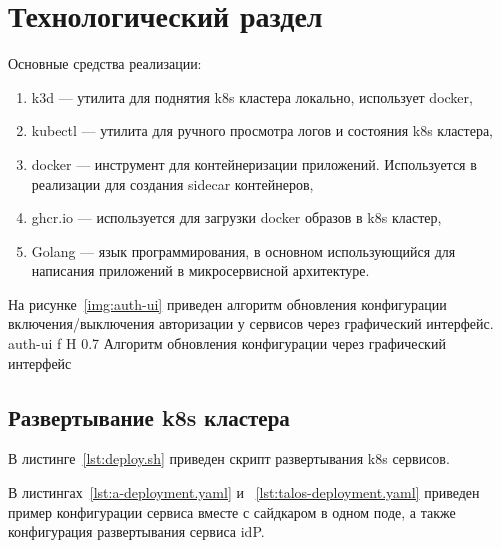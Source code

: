 \chapter{Технологический раздел}

Основные средства реализации:
\begin{enumerate}
\item k3d --- утилита для поднятия k8s кластера локально, использует docker, %
\item kubectl --- утилита для ручного просмотра логов и состояния k8s кластера,
\item docker --- инструмент для контейнеризации приложений. Используется в реализации для создания sidecar контейнеров,
\item ghcr.io --- используется для загрузки docker образов в k8s кластер,
\item Golang --- язык программирования, в основном использующийся для написания приложений в микросервисной архитектуре. %
\end{enumerate}


На рисунке~\ref{img:auth-ui} приведен алгоритм обновления конфигурации включения/выключения авторизации у сервисов через графический интерфейс.
    {auth-ui}
    {f}
    {H}
    {0.7\textwidth}
    {Алгоритм обновления конфигурации через графический интерфейс}



\section{Развертывание k8s кластера}
В листинге~\ref{lst:deploy.sh} приведен скрипт развертывания k8s сервисов. 

В листингах~\ref{lst:a-deployment.yaml} и ~\ref{lst:talos-deployment.yaml} приведен пример  конфигурации сервиса вместе с сайдкаром в одном поде, а также конфигурация развертывания сервиса idP. 

%

